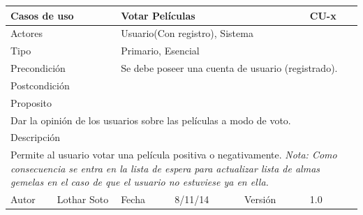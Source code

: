 \documentclass{article}
\begin{document}
\clearpage
\begin{table}[h]
\begin{tabular}{|l|l|l|l|l|l|}
\hline
\multicolumn{2}{|p{2cm}|}{Casos de uso}  & \multicolumn{3}{p{7cm}|}{\textbf{Votar Películas}} & CU-x \\
\hline
\multicolumn{2}{|p{2cm}|}{Actores}       & \multicolumn{4}{p{8cm}|}{Usuario(Con registro), Sistema}        \\
\hline
\multicolumn{2}{|p{2cm}|}{Tipo}          & \multicolumn{4}{p{8cm}|}{Primario, Esencial}        \\
\hline
\multicolumn{2}{|p{2cm}|}{Precondición}  & \multicolumn{4}{p{8cm}|}{Se debe poseer una cuenta de usuario (registrado).}        \\
\hline
\multicolumn{2}{|p{2cm}|}{Postcondición} & \multicolumn{4}{p{8cm}|}{}        \\
\hline
\multicolumn{6}{|p{10cm}|}{Proposito}                                   \\
\hline
\multicolumn{6}{|p{10cm}|}{Dar la opinión de los usuarios sobre las películas a modo de voto.}                                            \\
\hline
\multicolumn{6}{|p{10cm}|}{Descripción}                                 \\
\hline
\multicolumn{6}{|p{10cm}|}{Permite al usuario votar una película positiva o negativamente.
\linebreak \textit{Nota: Como consecuencia se entra en la lista de espera para actualizar lista de almas gemelas en el caso de que el usuario no estuviese ya en ella.}}                                            \\
\hline
Autor          &       Lothar Soto        & Fecha    &  8/11/14   &   Versión  & 1.0\\     
\hline
\end{tabular}
\end{table}
\end{document}

